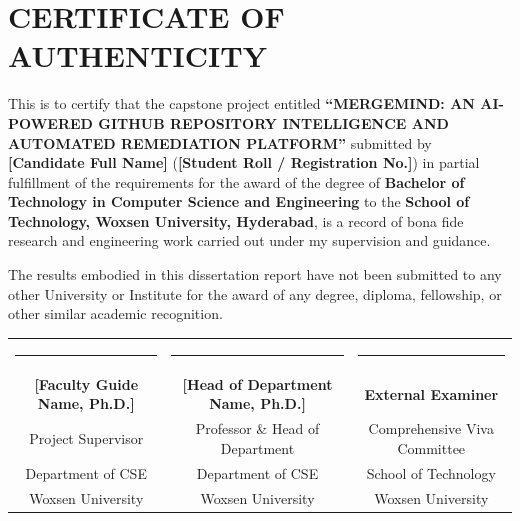 \chapter*{CERTIFICATE OF AUTHENTICITY}

This is to certify that the capstone project entitled \textbf{``MERGEMIND: AN AI-POWERED GITHUB REPOSITORY INTELLIGENCE AND AUTOMATED REMEDIATION PLATFORM''} submitted by \textbf{[Candidate Full Name]} (\textbf{[Student Roll / Registration No.]}) in partial fulfillment of the requirements for the award of the degree of \textbf{Bachelor of Technology in Computer Science and Engineering} to the \textbf{School of Technology, Woxsen University, Hyderabad}, is a record of bona fide research and engineering work carried out under my supervision and guidance.

\vspace{0.6cm}
The results embodied in this dissertation report have not been submitted to any other University or Institute for the award of any degree, diploma, fellowship, or other similar academic recognition.

\vspace{3.5cm}

\noindent
\begin{tabular*}{\textwidth}{@{\extracolsep{\fill}}ccc}
    \rule{4.5cm}{0.4pt} & \rule{4.5cm}{0.4pt} & \rule{4.5cm}{0.4pt} \\
    \textbf{[Faculty Guide Name, Ph.D.]} & \textbf{[Head of Department Name, Ph.D.]} & \textbf{External Examiner} \\
    Project Supervisor & Professor \& Head of Department & Comprehensive Viva Committee \\
    Department of CSE & Department of CSE & School of Technology \\
    Woxsen University & Woxsen University & Woxsen University \\
\end{tabular*}

